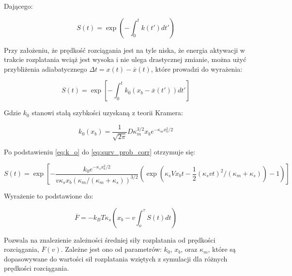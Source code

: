 Dającego:

\begin{equation} S(t) = \exp\left( - \int_0^t k(t')dt' \right) \label{eq:surv_prob1}\end{equation}

Przy założeniu, że prędkość rozciągania jest na tyle niska, że energia aktywacji w trakcie rozplatania wciąż jest wysoka i nie ulega drastycznej zmianie, można użyć przybliżenia adiabatycznego $\Delta t=x(t)- \overline{x}(t)$, które prowadzi do wyrażenia:

\begin{equation} S(t) = \exp\left[ - \int_0^t k_{0}(x_b-\overline{x}(t'))dt' \right] \label{eq:surv_prob_corr}\end{equation}

Gdzie $k_0$ stanowi stałą szybkości uzyskaną z teorii Kramera:

\begin{equation} k_0(x_b)=\frac{1}{\sqrt{2\pi}}D\kappa_m^{3/2}x_b e^{-\kappa_mx_b^2/2} \label{eq:k_o}\end{equation}

Po podstawieniu \ref{eq:k_o} do \ref{eq:surv_prob_corr} otrzymuje się:

\begin{equation} S(t) = \exp\left[ - \frac{k_0 e^{-\kappa_s x_b^2 /2}}{v\kappa_s x_b (\kappa_m/(\kappa_m + \kappa_s))^{3/2}} (\exp(\kappa_s V x_b t -\frac{1}{2} (\kappa_s v t )^2 /(\kappa_m+ \kappa_s))-1) \right] \label{eq:s_t}\end{equation}

Wyrażenie to podstawione do:

\begin{equation} \overline{F}= - k_B T \kappa_s \left( x_b -v \int_o^\tau S(t)dt\right)\label{eq:wyn}\end{equation}

Pozwala na znalezienie zależności średniej siły rozplatania od prędkości rozciągania, $\overline{F}(v)$. Zależne jest ono od parametrów: $k_0$, $x_b$, oraz $\kappa_m$, które są dopasowywane do wartości sił rozplatania wziętych z symulacji dla różnych prędkości rozciągania.
